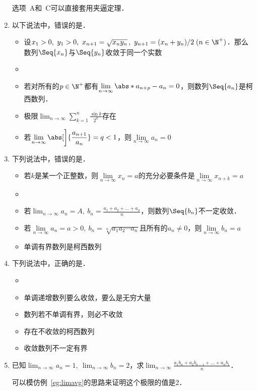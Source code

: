 \begin{enumerate}
  选项~A和~C可以直接套用夹逼定理．
  \fi

\item 以下说法中，错误的是\uline{\makebox[10em]{}}．
  \begin{itemize}
    \renewcommand{\labelitemi}{\faCircleThin}
    \addtolength{\itemsep}{1ex}
  \item 设\(x_1 > 0,\ y_1 > 0,\ x_{n+1} = \sqrt{x_n y_n}\,,\ y_{n+1} = (x_n+y_n)/2 \; (n \in \N^+)\)．那么数列\(\Seq{x_n}\)与\(\Seq{y_n}\)收敛于同一个实数
    \ifshowsol
  \item[\faCircle]
    \else
  \item
    \fi
    若对所有的\(p \in \N^+\)都有\(\lim\limits_{n\to\infty} \abs*{a_{n+p}-a_n} = 0\)，则数列\(\Seq{a_n}\)是柯西数列． %
  \item 极限\(\displaystyle \lim_{n\to\infty} \sum_{k=1}^n \frac{\sin k}{2^k}\)存在
  \item 若\(\displaystyle \lim_{n\to\infty} \abs[\bigg]{\frac{a_{n+1}}{a_n}} = q < 1\)，则\(\lim\limits_{n\to\infty} a_n = 0\)
  \end{itemize}

\item 下列说法中，错误的是\uline{\makebox[10em]{}}．
  \begin{itemize}
    \renewcommand{\labelitemi}{\faCircleThin}
    \addtolength{\itemsep}{.67ex}
  \item 若\(k\)是某一个正整数，则\(\lim\limits_{n\to\infty} x_n = a\)的充分必要条件是\(\lim\limits_{n\to\infty} x_{n+k} = a\)
    \ifshowsol
  \item[\faCircle]
    \else
  \item
    \fi
    若\(\displaystyle \lim_{n\to\infty} a_n = A,\ b_n = \frac{a_1 + a_2 + \dots + a_n}{n}\)，则数列\(\Seq{b_n}\)不一定收敛．
  \item 若\(\lim\limits_{n\to\infty} a_n = a > 0,\ b_n = \sqrt[n]{a_1 a_2 \dotsm a_n}\)且所有的\(a_n \ne 0\)，则\(\lim\limits_{n\to\infty} b_n = a\)
  \item 单调有界数列是柯西数列
  \end{itemize}

\item 下列说法中，正确的是\uline{\makebox[10em]{}}．
  \begin{itemize}
    \renewcommand{\labelitemi}{\faCircleThin}
    \ifshowsol
  \item[\faCircle]
    \else
  \item
    \fi
    单调递增数列要么收敛，要么是无穷大量
  \item 数列若不单调有界，则必不收敛
  \item 存在不收敛的柯西数列
  \item 收敛数列不一定有界
  \end{itemize}

\item 已知\(\displaystyle \lim_{n\to\infty} a_n = 1,\ \lim_{n\to\infty} b_n = 2\)，求\(\displaystyle \lim_{n\to\infty} \frac{a_1 b_n + a_2 b_{n-1} + \dots + a_n b_1}{n}\)．

  \ifshowsol
  可以模仿例~\ref{eg:limavg}的思路来证明这个极限的值是\(2\)．
  \fi
\end{enumerate}
\fi

